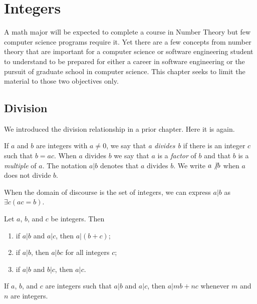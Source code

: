 



 


\chapter {Integers}
A math major will be expected to complete a course in Number Theory but few computer science programs require it. Yet there are a few concepts from number theory that are important for a computer science or software engineering student to understand to be prepared for either a career in software engineering or the pursuit of graduate school in computer science. This chapter seeks to limit the material to those two objectives only.

\section{Division}
We introduced the division relationship in a prior chapter. Here it is again.
\begin{definition}
If $a$ and $b$ are integers with $a \neq 0$, we say that \textit{a divides b} if there is an integer $c$ such that $b=ac$. When $a$ divides $b$ we say that $a$ is a \textit{factor} of $b$ and that $b$ is a \textit{multiple} of $a$. The notation $a \vert b$ denotes that $a$ divides $b$. We write $a \not\vert b$ when $a$ does not divide $b$.

When the domain of discourse is the set of integers, we can express $a\vert b$ as $\exists c(ac=b)$.
\end{definition}

\begin{theorem}
Let $a$, $b$, and $c$ be integers. Then 
\begin{enumerate}
\item if $a \vert b$ and $a \vert c$, then $a \vert (b+c)$;
\item if $a \vert b$, then $a \vert bc$ for all integers $c$;
\item if $a \vert b$ and $b \vert c$, then $a \vert c$.
\end{enumerate}
\end{theorem}

\begin{corollary}
If $a$, $b$, and $c$ are integers such that $a \vert b$ and $a \vert c$, then $a \vert mb+nc$ whenever $m$ and $n$ are integers.
\end{corollary}

